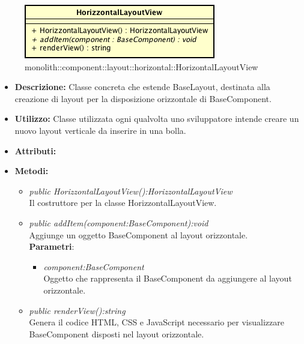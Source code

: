 \label{monolith::component::layout::horizontal::HorizontalLayoutView}
\begin{figure}[H]
	\centering
	\includegraphics[scale=0.5]{Sezioni/SottosezioniST/img/HorizontalLayoutView.png}
	\caption{monolith::component::layout::horizontal::HorizontalLayoutView}
\end{figure}

\begin{itemize}
\item \textbf{Descrizione:} Classe concreta che estende BaseLayout, destinata alla creazione di layout  per la disposizione orizzontale di BaseComponent.
\item \textbf{Utilizzo:} Classe utilizzata ogni qualvolta uno sviluppatore intende creare un nuovo layout verticale da inserire in una bolla.
\item \textbf{Attributi:}
\item \textbf{Metodi:}
\begin{itemize}
\item\textit{public HorizzontalLayoutView():HorizzontalLayoutView}\\
Il costruttore per la classe HorizzontalLayoutView.
\item \textit{public addItem(component:BaseComponent):void}\\
Aggiunge un oggetto BaseComponent al layout orizzontale.
\\ \textbf{Parametri}: \begin{itemize}
\item \textit{component:BaseComponent}\\
Oggetto che rappresenta il BaseComponent da aggiungere al layout orizzontale.
\end{itemize}
\item \textit{public renderView():string}\\
Genera il codice HTML, CSS e JavaScript necessario per visualizzare BaseComponent disposti nel layout orizzontale.
\end{itemize}
\end{itemize}